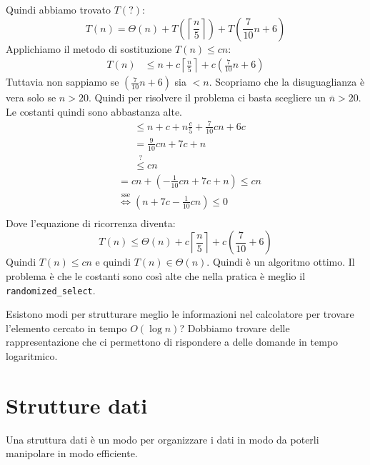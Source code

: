 \documentclass[a4paper]{article}
\begin{document}
\begin{enumerate}
    \vspace{1em}
    \noindent
    Quindi abbiamo trovato \( T(?) \):
    \[
      T(n) = \Theta (n) + T\left(\left\lceil \frac{n}{5} \right\rceil\right) + T\left(\frac{7}{10} n + 6\right)
    \]
    Applichiamo il metodo di sostituzione \( T(n) \le cn \):
    \[
      \begin{aligned}
        T(n) &\le n + c \left\lceil \frac{n}{5} \right\rceil + c \left( \frac{7}{10}
        n + 6\right) \end{aligned}
    \]
    Tuttavia non sappiamo se $\left(\frac{7}{10}n + 6\right)$ sia $< n$. Scopriamo che la disuguaglianza è vera
    solo se $n > 20$. Quindi per risolvere il problema ci basta scegliere un $\overline{n} > 20$. Le costanti quindi
    sono abbastanza alte.
    \[
        \begin{aligned}
             & \le n + c + n \frac{c}{5} + \frac{7}{10} cn + 6c \\
             &= \frac{9}{10}cn + 7c + n \\
             & \stackrel{?}{\le} cn
      \end{aligned}
    \]
    \[
      \begin{aligned}
        &=  cn + \left(- \frac{1}{10}cn + 7c + n\right) \le cn \\
        &\stackrel{\text{sse}}{\Longleftrightarrow} \left(n + 7c - \frac{1}{10}cn\right)\le 0\\
      \end{aligned}
    \]
    Dove l'equazione di ricorrenza diventa:
    \[T(n) \le \Theta(n) + c\left\lceil\frac{n}{5}\right\rceil + c\left(\frac{7}{10} + 6\right)\]
    Quindi \( T(n) \le cn \) e quindi \( T(n) \in \Theta(n) \). Quindi è un algoritmo ottimo.
    Il problema è che le costanti sono così alte che nella pratica è meglio il \texttt{randomized\_select}.
\end{enumerate}
Esistono modi per strutturare meglio le informazioni nel calcolatore
per trovare l'elemento cercato in tempo $O(\log n)$? Dobbiamo trovare delle rappresentazione
che ci permettono di rispondere a delle domande in tempo logaritmico.

\pagebreak

\section{Strutture dati}

Una struttura dati è un modo per organizzare i dati in modo da poterli manipolare in modo efficiente.
\end{document}
